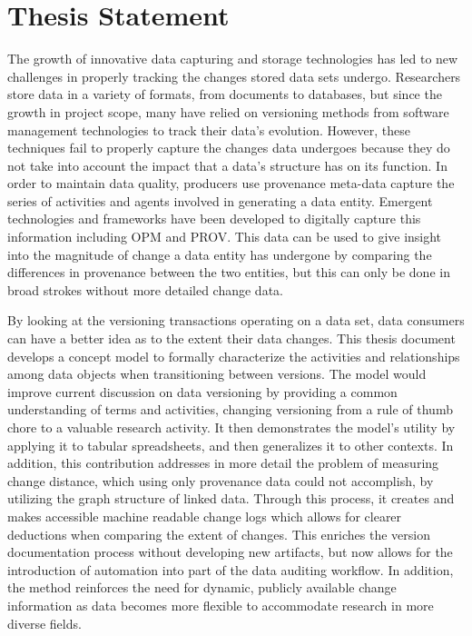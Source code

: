 \section{Thesis Statement}

The growth of innovative data capturing and storage technologies has led to new challenges in properly tracking the changes stored data sets undergo.
Researchers store data in a variety of formats, from documents to databases, but since the growth in project scope, many have relied on versioning methods from software management technologies to track their data's evolution.
However, these techniques fail to properly capture the changes data undergoes because they do not take into account the impact that a data's structure has on its function.
In order to maintain data quality, producers use provenance meta-data capture the series of activities and agents involved in generating a data entity.
Emergent technologies and frameworks have been developed to digitally capture this information including OPM and PROV.
This data can be used to give insight into the magnitude of change a data entity has undergone by comparing the differences in provenance between the two entities, but this can only be done in broad strokes without more detailed change data.

By looking at the versioning transactions operating on a data set, data consumers can have a better idea as to the extent their data changes.
This thesis document develops a concept model to formally characterize the activities and relationships among data objects when transitioning between versions.
The model would improve current discussion on data versioning by providing a common understanding of terms and activities, changing versioning from a rule of thumb chore to a valuable research activity.
It then demonstrates the model's utility by applying it to tabular spreadsheets, and then generalizes it to other contexts.
In addition, this contribution addresses in more detail the problem of measuring change distance, which using only provenance data could not accomplish, by utilizing the graph structure of linked data.
Through this process, it creates and makes accessible machine readable change logs which allows for clearer deductions when comparing the extent of changes.
This enriches the version documentation process without developing new artifacts, but now allows for the introduction of automation into part of the data auditing workflow.
In addition, the method reinforces the need for dynamic, publicly available change information as data becomes more flexible to accommodate research in more diverse fields.



